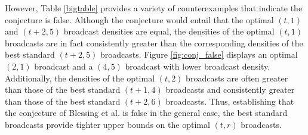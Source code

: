 \documentclass[12pt]{amsart}
\newcounter{x}
\newcounter{y}
\newcounter{x2}
\newcounter{y2}
\begin{document}
However, Table \ref{bigtable} provides a variety of counterexamples that indicate the conjecture is false. Although the conjecture would entail that the optimal $(t,1)$ and $(t+2,5)$ broadcast densities are equal, the densities of the optimal $(t,1)$ broadcasts are in fact consistently greater than the corresponding densities of the best standard $(t+2,5)$ broadcasts. Figure \ref{fig:conj_false} displays an optimal $(2,1)$ broadcast and a $(4,5)$ broadcast with lower broadcast density. Additionally, the densities of the optimal $(t,2)$ broadcasts are often greater than those of the best standard $(t+1,4)$ broadcasts and consistently greater than those of the best standard $(t+2,6)$ broadcasts. Thus, establishing that the conjecture of Blessing et al. is false in the general case, the best standard broadcasts provide tighter upper bounds on the optimal $(t,r)$ broadcasts. 
\end{document}
